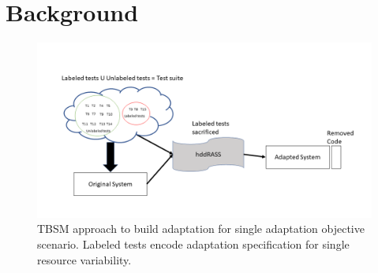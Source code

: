 
\section{Background}
\label{ref:background}
\begin{figure}
\begin{center}
\includegraphics[scale = 0.50]{icst_19_fig1.png}
\caption{TBSM approach to build adaptation for single adaptation objective
scenario. Labeled tests encode adaptation specification for single resource
variability.}
\label{fig:workflow}
\end{center}
\end{figure}

